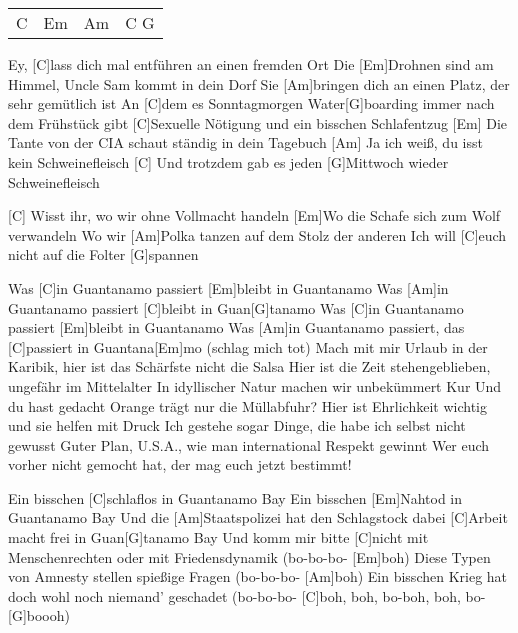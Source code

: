 



\begin{guitar}
	{\footnotesize\begin{tabular}{l|l|l|l}
			C & Em & Am & C G
	\end{tabular}}	
	
	Ey, [C]lass dich mal entführen an einen fremden Ort
	Die [Em]Drohnen sind am Himmel, Uncle Sam kommt in dein Dorf
	Sie [Am]bringen dich an einen Platz, der sehr gemütlich ist
	An [C]dem es Sonntagmorgen Water[G]boarding immer nach dem Frühstück gibt
	[C]Sexuelle Nötigung und ein bisschen Schlafentzug
	[Em] Die Tante von der CIA schaut ständig in dein Tagebuch
	[Am] Ja ich weiß, du isst kein Schweinefleisch
	[C] Und trotzdem gab es jeden [G]Mittwoch wieder Schweinefleisch
	
	[C] Wisst ihr, wo wir ohne Vollmacht handeln
	[Em]Wo die Schafe sich zum Wolf verwandeln
	Wo wir [Am]Polka tanzen auf dem Stolz der anderen
	Ich will [C]euch nicht auf die Folter [G]spannen
	
	Was [C]in Guantanamo passiert [Em]bleibt in Guantanamo
	Was [Am]in Guantanamo passiert [C]bleibt in Guan[G]tanamo
	Was [C]in Guantanamo passiert [Em]bleibt in Guantanamo
	Was [Am]in Guantanamo passiert, das [C]passiert in Guantana[Em]mo (schlag mich tot)
	\pagebreak
	Mach mit mir Urlaub in der Karibik, hier ist das Schärfste nicht die Salsa
	Hier ist die Zeit stehengeblieben, ungefähr im Mittelalter
	In idyllischer Natur machen wir unbekümmert Kur
	Und du hast gedacht Orange trägt nur die Müllabfuhr?
	Hier ist Ehrlichkeit wichtig und sie helfen mit Druck
	Ich gestehe sogar Dinge, die habe ich selbst nicht gewusst
	Guter Plan, U.S.A., wie man international Respekt gewinnt
	Wer euch vorher nicht gemocht hat, der mag euch jetzt bestimmt!

	 
	
	 
	
	Ein bisschen [C]schlaflos in Guantanamo Bay
	Ein bisschen [Em]Nahtod in Guantanamo Bay
	Und die [Am]Staatspolizei hat den Schlagstock dabei
	[C]Arbeit macht frei in Guan[G]tanamo Bay
	Und komm mir bitte [C]nicht mit Menschenrechten oder mit Friedensdynamik (bo-bo-bo-
	[Em]boh) Diese Typen von Amnesty stellen spießige Fragen (bo-bo-bo-
	[Am]boh) Ein bisschen Krieg hat doch wohl noch niemand' geschadet (bo-bo-bo-
	[C]boh, boh, bo-boh, boh, bo-[G]boooh)
	
	 
	
	 
\end{guitar}

